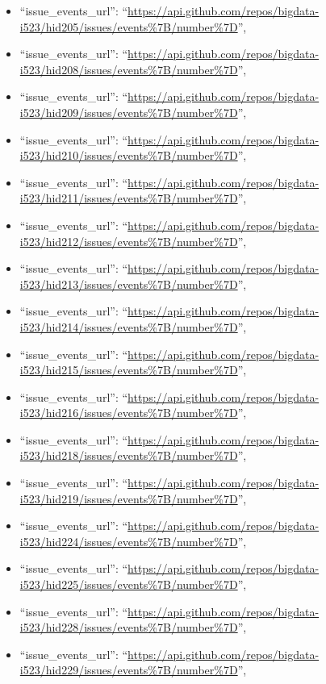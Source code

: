 \begin{itemize}
\item
  ``issue\_events\_url'':
  ``\url{https://api.github.com/repos/bigdata-i523/hid205/issues/events\%7B/number\%7D}'',
\item
  ``issue\_events\_url'':
  ``\url{https://api.github.com/repos/bigdata-i523/hid208/issues/events\%7B/number\%7D}'',
\item
  ``issue\_events\_url'':
  ``\url{https://api.github.com/repos/bigdata-i523/hid209/issues/events\%7B/number\%7D}'',
\item
  ``issue\_events\_url'':
  ``\url{https://api.github.com/repos/bigdata-i523/hid210/issues/events\%7B/number\%7D}'',
\item
  ``issue\_events\_url'':
  ``\url{https://api.github.com/repos/bigdata-i523/hid211/issues/events\%7B/number\%7D}'',
\item
  ``issue\_events\_url'':
  ``\url{https://api.github.com/repos/bigdata-i523/hid212/issues/events\%7B/number\%7D}'',
\item
  ``issue\_events\_url'':
  ``\url{https://api.github.com/repos/bigdata-i523/hid213/issues/events\%7B/number\%7D}'',
\item
  ``issue\_events\_url'':
  ``\url{https://api.github.com/repos/bigdata-i523/hid214/issues/events\%7B/number\%7D}'',
\item
  ``issue\_events\_url'':
  ``\url{https://api.github.com/repos/bigdata-i523/hid215/issues/events\%7B/number\%7D}'',
\item
  ``issue\_events\_url'':
  ``\url{https://api.github.com/repos/bigdata-i523/hid216/issues/events\%7B/number\%7D}'',
\item
  ``issue\_events\_url'':
  ``\url{https://api.github.com/repos/bigdata-i523/hid218/issues/events\%7B/number\%7D}'',
\item
  ``issue\_events\_url'':
  ``\url{https://api.github.com/repos/bigdata-i523/hid219/issues/events\%7B/number\%7D}'',
\item
  ``issue\_events\_url'':
  ``\url{https://api.github.com/repos/bigdata-i523/hid224/issues/events\%7B/number\%7D}'',
\item
  ``issue\_events\_url'':
  ``\url{https://api.github.com/repos/bigdata-i523/hid225/issues/events\%7B/number\%7D}'',
\item
  ``issue\_events\_url'':
  ``\url{https://api.github.com/repos/bigdata-i523/hid228/issues/events\%7B/number\%7D}'',
\item
  ``issue\_events\_url'':
  ``\url{https://api.github.com/repos/bigdata-i523/hid229/issues/events\%7B/number\%7D}'',

\end{itemize}
